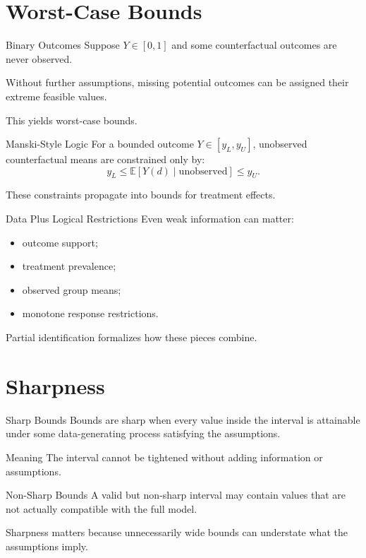 \documentclass[aspectratio=169,11pt]{beamer}
\begin{document}
\section{Worst-Case Bounds}

\begin{frame}{Binary Outcomes}
Suppose \(Y\in[0,1]\) and some counterfactual outcomes are never observed.

Without further assumptions, missing potential outcomes can be assigned their extreme feasible values.

This yields worst-case bounds.
\end{frame}

\begin{frame}{Manski-Style Logic}
For a bounded outcome \(Y\in[y_L,y_U]\), unobserved counterfactual means are constrained only by:
\[
y_L \leq \mathbb E[Y(d)\mid \text{unobserved}] \leq y_U.
\]

These constraints propagate into bounds for treatment effects.
\end{frame}

\begin{frame}{Data Plus Logical Restrictions}
Even weak information can matter:
\begin{itemize}
\item outcome support;
\item treatment prevalence;
\item observed group means;
\item monotone response restrictions.
\end{itemize}

Partial identification formalizes how these pieces combine.
\end{frame}

\section{Sharpness}

\begin{frame}{Sharp Bounds}
Bounds are sharp when every value inside the interval is attainable under some data-generating process satisfying the assumptions.

\begin{block}{Meaning}
The interval cannot be tightened without adding information or assumptions.
\end{block}
\end{frame}

\begin{frame}{Non-Sharp Bounds}
A valid but non-sharp interval may contain values that are not actually compatible with the full model.

Sharpness matters because unnecessarily wide bounds can understate what the assumptions imply.
\end{frame}
\end{document}
